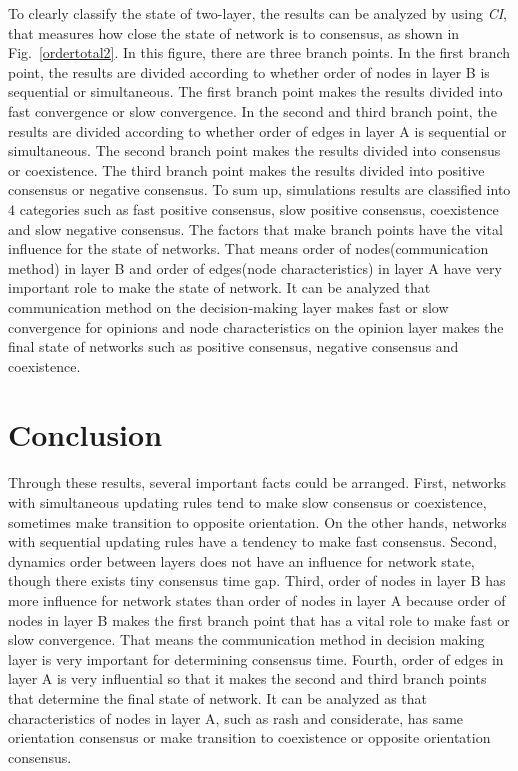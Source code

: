 To clearly classify the state of two-layer, the results can be analyzed by using \textit{CI}, that measures how close the state of network is to consensus, as shown in Fig.~\ref{ordertotal2}. In this figure, there are three branch points. In the first branch point, the results are divided according to whether order of nodes in layer B is sequential or simultaneous. The first branch point makes the results divided into fast convergence or slow convergence. In the second and third branch point, the results are divided according to whether order of edges in layer A is sequential or simultaneous. The second branch point makes the results divided into consensus or coexistence. The third branch point makes the results divided into positive consensus or negative consensus. To sum up, simulations results are classified into $4$ categories such as fast positive consensus, slow positive consensus, coexistence and slow negative consensus. The factors that make branch points have the vital influence for the state of networks. That means order of nodes(communication method) in layer B and order of edges(node characteristics) in layer A have very important role to make the state of network. It can be analyzed that communication method on the decision-making layer makes fast or slow convergence for opinions and node characteristics on the opinion layer makes the final state of networks such as positive consensus, negative consensus and coexistence. \\

\section{Conclusion}
Through these results, several important facts could be arranged. First, networks with simultaneous updating rules tend to make slow consensus or coexistence, sometimes make transition to opposite orientation. On the other hands, networks with sequential updating rules have a tendency to make fast consensus. Second, dynamics order between layers does not have an influence for network state, though there exists tiny consensus time gap. Third, order of nodes in layer B has more influence for network states than order of nodes in layer A because order of nodes in layer B makes the first branch point that has a vital role to make fast or slow convergence. That means the communication method in decision making layer is very important for determining consensus time. Fourth, order of edges in layer A is very influential so that it makes the second and third branch points that determine the final state of network. It can be analyzed as that characteristics of nodes in layer A, such as rash and considerate, has same orientation consensus or make transition to coexistence or opposite orientation consensus.\\



